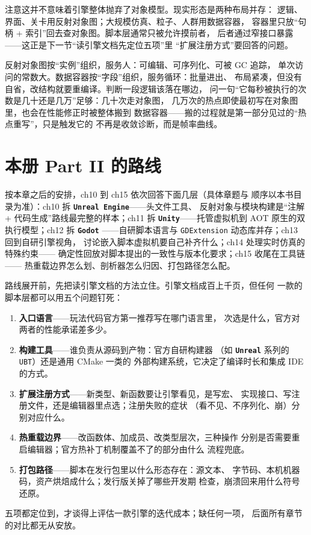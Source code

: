 \documentclass[12pt,a4paper,fontset=fandol]{ctexbook}
\newcommand{\Tp}[1]{\texttt{#1}}
\newcommand{\Lib}[1]{\textbf{\texttt{#1}}}
\begin{document}
注意这并不意味着引擎整体抛弃了对象模型。现实形态是两种布局并存：
逻辑、界面、关卡用反射对象图；大规模仿真、粒子、人群用数据容器，
容器里只放``句柄 + 索引''回去查对象图。脚本层通常只被允许摸前者，
后者通过窄接口暴露——这正是下一节``读引擎文档先定位五项''里
``扩展注册方式''要回答的问题。

\begin{compare}[title={反射对象图与数据容器的分工}]
反射对象图按``实例''组织，服务人：可编辑、可序列化、可被 GC 追踪，
单次访问的常数大。数据容器按``字段''组织，服务循环：批量进出、
布局紧凑，但没有自省，改结构就要重编译。判断一段逻辑该落在哪边，
问一句``它每秒被执行的次数是几十还是几万''足够：几十次走对象图，
几万次的热点即使最初写在对象图里，也会在性能修正时被整体搬到
数据容器——搬的过程就是第一部分见过的``热点重写''，只是触发它的
不再是收敛诊断，而是帧率曲线。
\end{compare}

\section{本册 Part II 的路线}
\label{sec:ch09-partii-route}

按本章之后的安排，ch10 到 ch15 依次回答下面几层（具体章题与
顺序以本书目录为准）：ch10 拆 \Lib{Unreal Engine}——头文件工具、
反射对象与模块构建是``注解 + 代码生成''路线最完整的样本；ch11 拆
\Lib{Unity}——托管虚拟机到 AOT 原生的双执行模型；ch12 拆 \Lib{Godot}
——自研脚本语言与 \Tp{GDExtension} 动态库并存；ch13 回到自研引擎视角，
讨论嵌入脚本虚拟机要自己补齐什么；ch14 处理实时仿真的特殊约束——
确定性回放对脚本提出的一致性与版本化要求；ch15 收尾在工具链——
热重载边界怎么划、剖析器怎么归因、打包路径怎么配。

路线展开前，先把读引擎文档的方法立住。引擎文档成百上千页，但任何
一款的脚本层都可以用五个问题钉死：

\begin{guideline}[title={读一款引擎的文档，先定位这五项}]
\begin{enumerate}
\item \textbf{入口语言}——玩法代码官方第一推荐写在哪门语言里，
      次选是什么，官方对两者的性能承诺差多少。
\item \textbf{构建工具}——谁负责从源码到产物：官方自研构建器
      （如 \Lib{Unreal} 系列的 \Tp{UBT}）还是通用 CMake 一类的
      外部构建系统，它决定了编译时长和集成 IDE 的方式。
\item \textbf{扩展注册方式}——新类型、新函数要让引擎看见，是写宏、
      实现接口、写注册文件，还是编辑器里点选；注册失败的症状
      （看不见、不序列化、崩）分别对应什么。
\item \textbf{热重载边界}——改函数体、加成员、改类型层次，三种操作
      分别是否需要重启编辑器；官方热补丁机制覆盖不了的部分由什么
      流程兜底。
\item \textbf{打包路径}——脚本在发行包里以什么形态存在：源文本、
      字节码、本机机器码，资产烘焙成什么；发行版关掉了哪些开发期
      检查，崩溃回来用什么符号还原。
\end{enumerate}
五项都定位到，才谈得上评估一款引擎的迭代成本；缺任何一项，
后面所有章节的对比都无从安放。
\end{guideline}
\end{document}
